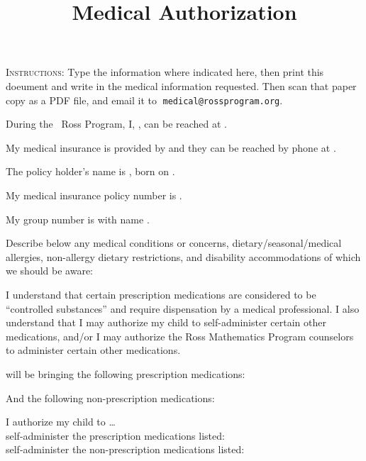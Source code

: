 \documentclass{ross}
\title{Medical Authorization}
\begin{document}
\maketitle

\textsc{Instructions:} Type the information where indicated here, then print this doeument and write in the medical information requested. Then scan that paper copy as a PDF file, and email it to$\;$ \texttt{medical@rossprogram.org}.


During the \the\year\ Ross Program, I, , can be reached at .

My medical insurance is provided by  and they can be reached by phone at .

The policy holder's name is , born on .

My medical insurance policy number is .

My group number is  with name .

\vspace{1ex}

Describe below any medical conditions or concerns,
dietary/seasonal/medical allergies, non-allergy dietary restrictions,
and disability accommodations of which we should be aware:

\pagebreak

I understand that certain prescription medications are considered to
be ``controlled substances'' and require dispensation by a medical
professional. I also understand that I may authorize my child to
self-administer certain other medications, and/or I may authorize the
Ross Mathematics Program counselors to administer certain other
medications.


 will be bringing the following prescription medications:

\vspace{0.7in}

And the following non-prescription medications:

\vspace{0.7in}

I authorize my child to \ldots \\
self-administer the \phantom{non-}prescription medications listed:   \\
self-administer the non-prescription medications listed:   \\
\end{document}
